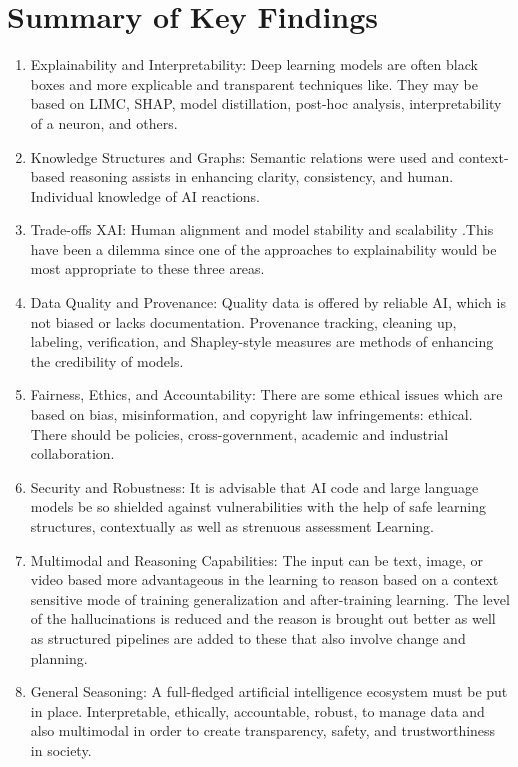 \section{Summary of Key Findings}
\begin{enumerate}
    \renewcommand{\labelenumi}{\roman{enumi})} %
    \item Explainability and Interpretability: Deep learning models are often black boxes and more explicable and transparent techniques like. They may be based on LIMC, SHAP, model distillation, post-hoc analysis, interpretability of a neuron, and others.

    \item Knowledge Structures and Graphs:  Semantic relations were used and context-based reasoning assists in enhancing clarity, consistency, and human. Individual knowledge of AI reactions.
    
    \item Trade-offs XAI:  Human alignment and model stability and scalability .This have been a dilemma since one of the approaches to explainability would be most appropriate to these three areas.

    \item Data Quality and Provenance:  Quality data is offered by reliable AI, which is not biased or lacks documentation. Provenance tracking, cleaning up, labeling, verification, and Shapley-style measures are methods of enhancing the credibility of models.

    \item Fairness, Ethics, and Accountability:  There are some ethical issues which are based on bias, misinformation, and copyright law infringements: ethical. There should be policies, cross-government, academic and industrial collaboration.

    \item Security and Robustness:  It is advisable that AI code and large language models be so shielded against vulnerabilities with the help of safe learning structures, contextually as well as strenuous assessment Learning.

    \item Multimodal and Reasoning Capabilities: The input can be text, image, or video based more advantageous in the learning to reason based on a context sensitive mode of training generalization and after-training learning. The level of the hallucinations is reduced and the reason is brought out better as well as structured pipelines are added to these that also involve change and planning.

    \item General Seasoning:  A full-fledged artificial intelligence ecosystem must be put in place. Interpretable, ethically, accountable, robust, to manage data and also multimodal in order to create transparency, safety, and trustworthiness in society.

\end{enumerate}
\vspace{8em} 




